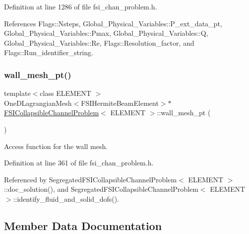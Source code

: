 Definition at line 1286 of file fsi\+\_\+chan\+\_\+problem.\+h.



References Flags\+::\+Nsteps, Global\+\_\+\+Physical\+\_\+\+Variables\+::\+P\+\_\+ext\+\_\+data\+\_\+pt, Global\+\_\+\+Physical\+\_\+\+Variables\+::\+Pmax, Global\+\_\+\+Physical\+\_\+\+Variables\+::Q, Global\+\_\+\+Physical\+\_\+\+Variables\+::\+Re, Flags\+::\+Resolution\+\_\+factor, and Flags\+::\+Run\+\_\+identifier\+\_\+string.

\mbox{\label{classFSICollapsibleChannelProblem_ae8b71da8da82f3c52387052ce400b930}} 
\subsubsection{\texorpdfstring{wall\+\_\+mesh\+\_\+pt()}{wall\_mesh\_pt()}}
{\footnotesize\ttfamily template$<$class E\+L\+E\+M\+E\+NT $>$ \\
One\+D\+Lagrangian\+Mesh$<$F\+S\+I\+Hermite\+Beam\+Element$>$$\ast$ \hyperlink{classFSICollapsibleChannelProblem}{F\+S\+I\+Collapsible\+Channel\+Problem}$<$ E\+L\+E\+M\+E\+NT $>$\+::wall\+\_\+mesh\+\_\+pt (\begin{DoxyParamCaption}{ }\end{DoxyParamCaption})\hspace{0.3cm}{\ttfamily [inline]}}



Access function for the wall mesh. 



Definition at line 361 of file fsi\+\_\+chan\+\_\+problem.\+h.



Referenced by Segregated\+F\+S\+I\+Collapsible\+Channel\+Problem$<$ E\+L\+E\+M\+E\+N\+T $>$\+::doc\+\_\+solution(), and Segregated\+F\+S\+I\+Collapsible\+Channel\+Problem$<$ E\+L\+E\+M\+E\+N\+T $>$\+::identify\+\_\+fluid\+\_\+and\+\_\+solid\+\_\+dofs().



\subsection{Member Data Documentation}
\mbox{\label{classFSICollapsibleChannelProblem_a74c09286f4ad4242c37b6ea16c069fae}} 
